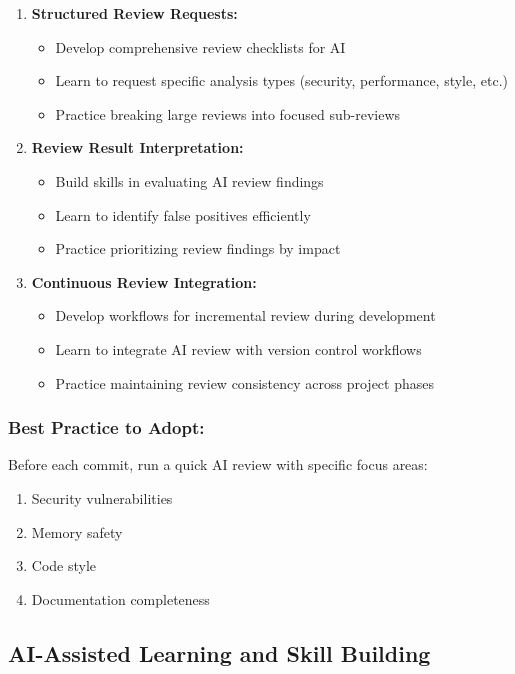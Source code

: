 \documentclass[12pt,a4paper]{article}
\begin{document}
\begin{enumerate}
    \item \textbf{Structured Review Requests:}
    \begin{itemize}
        \item Develop comprehensive review checklists for AI
        \item Learn to request specific analysis types (security, performance, style, etc.)
        \item Practice breaking large reviews into focused sub-reviews
    \end{itemize}
    
    \item \textbf{Review Result Interpretation:}
    \begin{itemize}
        \item Build skills in evaluating AI review findings
        \item Learn to identify false positives efficiently
        \item Practice prioritizing review findings by impact
    \end{itemize}
    
    \item \textbf{Continuous Review Integration:}
    \begin{itemize}
        \item Develop workflows for incremental review during development
        \item Learn to integrate AI review with version control workflows
        \item Practice maintaining review consistency across project phases
    \end{itemize}
\end{enumerate}

\subsubsection*{Best Practice to Adopt:}

Before each commit, run a quick AI review with specific focus areas:
\begin{enumerate}
    \item Security vulnerabilities
    \item Memory safety
    \item Code style
    \item Documentation completeness
\end{enumerate}

\subsection{AI-Assisted Learning and Skill Building}
\end{document}
